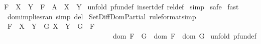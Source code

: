 \begin{isabellebody}
{\isachardoublequoteopen}{\isacharparenleft}F\ {\isacharcolon}\ {\isacharparenleft}X\ {\isacharminus}{\isacharbar}{\isacharminus}{\isachargreater}\ Y{\isacharparenright}{\isacharparenright}\ {\isacharminus}{\isacharminus}{\isachargreater}\ {\isacharparenleft}{\isacharparenleft}F\ {\isacharminus}\ A{\isacharparenright}\ {\isacharcolon}\ {\isacharparenleft}X\ {\isacharminus}{\isacharbar}{\isacharminus}{\isachargreater}\ Y{\isacharparenright}{\isacharparenright}{\isachardoublequoteclose}\isanewline
%
\isadelimproof
%
\endisadelimproof
%
\isatagproof
{}\isamarkupfalse%
\ {\isacharparenleft}unfold\ pfun{\isacharunderscore}def\ insert{\isacharunderscore}def\ rel{\isacharunderscore}def{\isacharparenright}\isanewline
{}\isamarkupfalse%
\ simp\isanewline
{}\isamarkupfalse%
\ safe\isanewline
{}\isamarkupfalse%
\ fast{\isacharplus}\isanewline
{}\isamarkupfalse%
%
\endisatagproof
{\isafoldproof}%
%
\isadelimproof
\isanewline
%
\endisadelimproof
\isanewline
{}\isamarkupfalse%
\ dom{\isacharunderscore}implies{\isacharunderscore}ran\ {\isacharbrackleft}simp\ del{\isacharbrackright}\isanewline
\isanewline
{}\isamarkupfalse%
\ Set{\isacharunderscore}Diff{\isacharunderscore}Dom{\isacharunderscore}Partial\ {\isacharbrackleft}rule{\isacharunderscore}format{\isacharcomma}simp{\isacharbrackright}{\isacharcolon}\isanewline
\ {\isachardoublequoteopen}{\isacharparenleft}F\ {\isacharcolon}\ {\isacharparenleft}X\ {\isacharminus}{\isacharbar}{\isacharminus}{\isachargreater}\ Y{\isacharparenright}{\isacharparenright}\ {\isacharminus}{\isacharminus}{\isachargreater}\ {\isacharparenleft}G\ {\isacharcolon}{\isacharparenleft}X\ {\isacharminus}{\isacharbar}{\isacharminus}{\isachargreater}\ Y{\isacharparenright}{\isacharparenright}\ {\isacharminus}{\isacharminus}{\isachargreater}\ {\isacharparenleft}G\ {\isacharless}{\isacharequal}\ F{\isacharparenright}\ {\isacharminus}{\isacharminus}{\isachargreater}\ \ \isanewline
\ \ \ \ \ \ \ \ \ \ \ \ \ \ \ \ \ \ \ \ \ \ \ \ \ \ \ \ \ \ \ {\isacharparenleft}{\isacharparenleft}dom\ {\isacharparenleft}F\ {\isacharminus}\ G{\isacharparenright}{\isacharparenright}\ {\isacharequal}\ {\isacharparenleft}{\isacharparenleft}dom\ F{\isacharparenright}\ {\isacharminus}\ {\isacharparenleft}dom\ G{\isacharparenright}{\isacharparenright}{\isacharparenright}{\isachardoublequoteclose}\isanewline
%
\isadelimproof
%
\endisadelimproof
%
\isatagproof
{}\isamarkupfalse%
\ {\isacharparenleft}unfold\ pfun{\isacharunderscore}def{\isacharparenright}\isanewline

\end{isabellebody}
